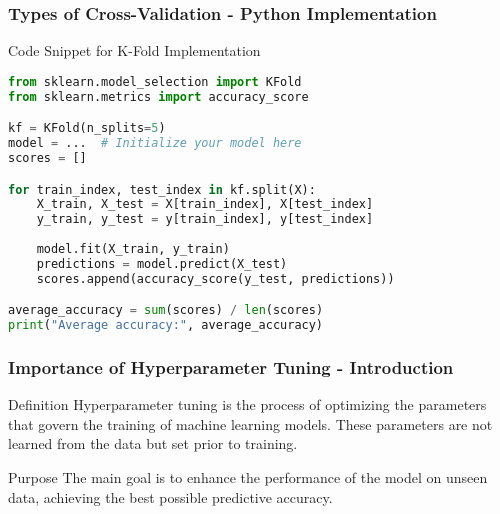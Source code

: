 \documentclass[aspectratio=169]{beamer}
\begin{document}
\begin{frame}[fragile]
    \frametitle{Types of Cross-Validation - Python Implementation}
    \begin{block}{Code Snippet for K-Fold Implementation}
        \begin{lstlisting}[language=Python]
from sklearn.model_selection import KFold
from sklearn.metrics import accuracy_score

kf = KFold(n_splits=5)
model = ...  # Initialize your model here
scores = []

for train_index, test_index in kf.split(X):
    X_train, X_test = X[train_index], X[test_index]
    y_train, y_test = y[train_index], y[test_index]
    
    model.fit(X_train, y_train)
    predictions = model.predict(X_test)
    scores.append(accuracy_score(y_test, predictions))

average_accuracy = sum(scores) / len(scores)
print("Average accuracy:", average_accuracy)
        \end{lstlisting}
    \end{block}
\end{frame}

\begin{frame}[fragile]
    \frametitle{Importance of Hyperparameter Tuning - Introduction}
    \begin{block}{Definition}
        Hyperparameter tuning is the process of optimizing the parameters that govern the training of machine learning models. These parameters are not learned from the data but set prior to training.
    \end{block}
    \begin{block}{Purpose}
        The main goal is to enhance the performance of the model on unseen data, achieving the best possible predictive accuracy.
    \end{block}
\end{frame}
\end{document}
